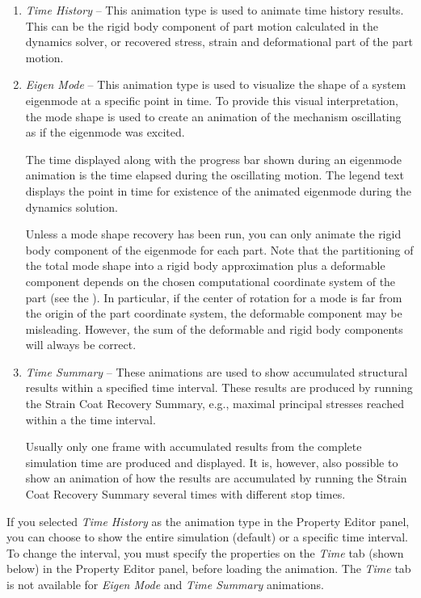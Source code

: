 \begin{enumerate}
\item{\sl Time History} --
  This animation type is used to animate time history results.
  This can be the rigid body component of part motion calculated in the dynamics
  solver, or recovered stress, strain and deformational part of the part motion.

\item{\sl Eigen Mode} --
  This animation type is used to visualize the shape of a system eigenmode at
  a specific point in time. To provide this visual interpretation, the mode
  shape is used to create an animation of the mechanism oscillating as if the
  eigenmode was excited.

  The time displayed along with the progress bar shown during an eigenmode
  animation is the time elapsed during the oscillating motion. The legend text
  displays the point in time for existence of the animated eigenmode during the
  dynamics solution.

  Unless a mode shape recovery has been run, you can only animate the rigid body
  component of the eigenmode for each part. Note that the partitioning of the
  total mode shape into a rigid body approximation plus a deformable component
  depends on the chosen computational coordinate system of the part
  (see the ).
  In particular, if the center of rotation for a mode is far from the origin of
  the part coordinate system, the deformable component may be misleading.
  However, the sum of the deformable and rigid body components will always be
  correct.

\item{\sl Time Summary} --
  These animations are used to show accumulated structural results within
  a specified time interval. These results are produced by running the Strain
  Coat Recovery Summary, e.g., maximal principal stresses reached within a
  the time interval.

  Usually only one frame with accumulated results from the complete simulation
  time are produced and displayed. It is, however, also possible to show an
  animation of how the results are accumulated by running the Strain Coat
  Recovery Summary several times with different stop times.
\end{enumerate}


If you selected {\sl Time History} as the animation type in the Property Editor
panel, you can choose to show the entire simulation (default) or a specific time
interval. To change the interval, you must specify the properties on the
{\sl Time} tab (shown below) in the Property Editor panel,
before loading the animation. The {\sl Time} tab is not available for
{\sl Eigen Mode} and {\sl Time Summary} animations.

